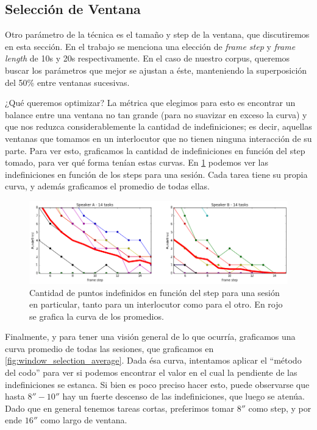 \subsection{Selección de Ventana}
\label{sec:window_selection}

Otro parámetro de la técnica es el tamaño y step de la ventana, que discutiremos en esta sección. En el trabajo \cite{KOU2008.2} se menciona una elección de \emph{frame step} y \emph{frame length} de 10s y 20s respectivamente. En el caso de nuestro corpus, queremos buscar los parámetros que mejor se ajustan a éste, manteniendo la superposición del 50\% entre ventanas sucesivas.

¿Qué queremos optimizar? La métrica que elegimos para esto es encontrar un balance entre una ventana no tan grande (para no suavizar en exceso la curva) y que nos reduzca considerablemente la cantidad de indefiniciones; es decir, aquellas ventanas que tomamos en un interlocutor que no tienen ninguna interacción de su parte. Para ver esto, graficamos la cantidad de indefiniciones en función del step tomado, para ver qué forma tenían estas curvas. En \ref{fig:window_selection_session} podemos ver las indefiniciones en función de los steps para una sesión. Cada tarea tiene su propia curva, y además graficamos el promedio de todas ellas.

\begin{figure}
\centering
\includegraphics[width=15cm]{images/window_selection_for_session.png}
\caption{Cantidad de puntos indefinidos en función del step para una sesión en particular, tanto para un interlocutor como para el otro. En rojo se grafica la curva de los promedios. }
\label{fig:window_selection_session}
\end{figure}

Finalmente, y para tener una visión general de lo que ocurría, graficamos una curva promedio de todas las sesiones, que graficamos en \ref{fig:window_selection_average}. Dada ésa curva, intentamos aplicar el ``método del codo'' para ver si podemos encontrar el valor en el cual la pendiente de las indefiniciones se estanca. Si bien es poco preciso hacer esto, puede observarse que hasta $8''-10''$ hay un fuerte descenso de las indefiniciones, que luego se atenúa. Dado que en general tenemos tareas cortas, preferimos tomar $8''$ como step, y por ende $16''$ como largo de ventana.

